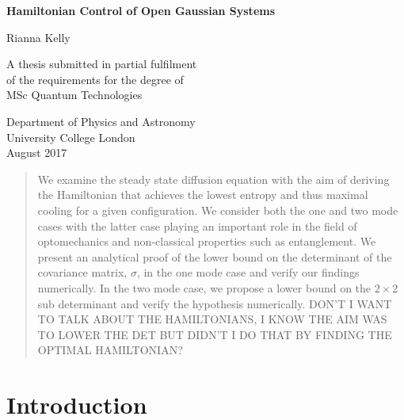 \documentclass[11pt,a4paper]{article}
\numberwithin{equation}{section}
\begin{document}
	\begin{titlepage}
		\begin{center}
			\vspace*{1cm}
			
			\textbf{\LARGE{Hamiltonian Control of Open Gaussian Systems}}
			
			\vspace{0.5cm}
			
			\large{Rianna Kelly}
			
			\vfill
			
			A thesis submitted in partial fulfilment\\
			of the requirements for the degree of\\
			MSc Quantum Technologies
			
			\vspace{1cm}
			
			Department of Physics and Astronomy\\
			University College London\\
			August 2017
			
			\vspace{0.25\textheight}
			
			
		\end{center}
	\end{titlepage}

	\begin{abstract}
		
	We examine the steady state diffusion equation with the aim of deriving the Hamiltonian that achieves the lowest entropy and thus maximal cooling for a given configuration. We consider both the one and two mode cases with the latter case playing an important role in the field of optomechanics and non-classical properties such as entanglement. We present an analytical proof of the lower bound on the determinant of the covariance matrix, $\sigma$, in the one mode case and verify our findings numerically. In the two mode case, we propose a lower bound on the $2 \times 2$ sub determinant and verify the hypothesis numerically. DON'T I WANT TO TALK ABOUT THE HAMILTONIANS, I KNOW THE AIM WAS TO LOWER THE DET BUT DIDN'T I DO THAT BY FINDING THE OPTIMAL HAMILTONIAN?
	
	\end{abstract}
		
	\tableofcontents
	\listoffigures

	\newpage
		
	\section{Introduction}
	
\end{document}
